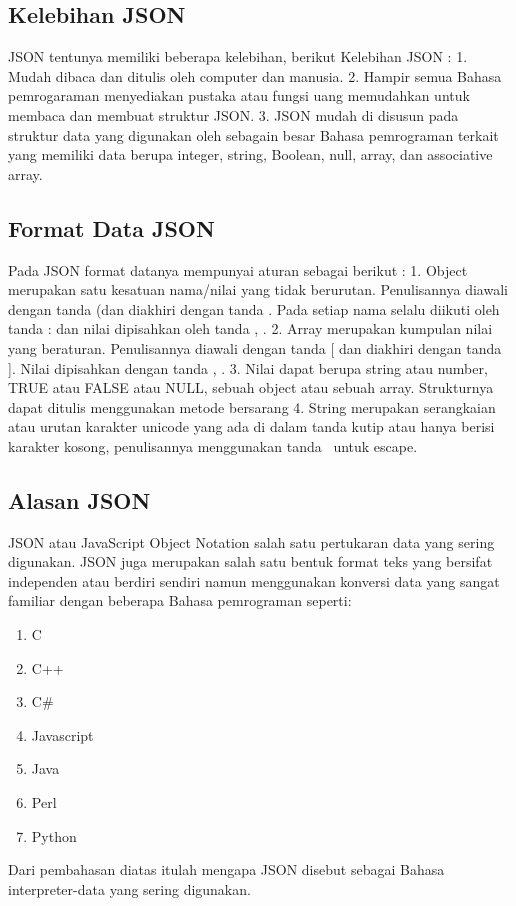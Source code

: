 \documentclass[a4paper]{article}
\begin{document}
\subsection{Kelebihan JSON}
JSON tentunya memiliki beberapa kelebihan, berikut Kelebihan JSON :
1.	Mudah dibaca dan ditulis oleh computer dan manusia.
2.	Hampir semua Bahasa pemrogaraman menyediakan pustaka atau fungsi uang memudahkan untuk membaca dan membuat struktur JSON.
3.	JSON mudah di disusun pada struktur data yang digunakan oleh sebagain besar Bahasa pemrograman terkait yang memiliki data berupa integer, string, Boolean, null, array, dan associative array.

\subsection{Format Data JSON}
Pada JSON format datanya mempunyai aturan sebagai berikut :
1. Object merupakan satu kesatuan nama/nilai yang tidak berurutan. Penulisannya diawali dengan tanda { (dan diakhiri dengan tanda } .
Pada setiap nama selalu diikuti oleh tanda : dan nilai dipisahkan oleh tanda , .
2.  Array merupakan kumpulan nilai yang beraturan. Penulisannya diawali dengan tanda [ dan diakhiri dengan tanda ]. Nilai dipisahkan dengan tanda , .
3. Nilai dapat berupa string atau number, TRUE atau FALSE atau NULL, sebuah object atau sebuah array. Strukturnya dapat ditulis menggunakan metode bersarang
4. String merupakan serangkaian atau urutan karakter unicode yang ada di dalam tanda kutip atau hanya berisi karakter kosong, penulisannya menggunakan tanda \  untuk escape.

\subsection{Alasan JSON}
JSON atau JavaScript Object Notation salah satu pertukaran data yang sering digunakan. JSON juga merupakan salah satu bentuk format teks yang bersifat independen atau berdiri sendiri namun menggunakan konversi data yang sangat familiar dengan beberapa Bahasa pemrograman seperti:

\begin{enumerate}
\item C
\item C++
\item C\#
\item Javascript
\item Java
\item Perl
\item Python

\end{enumerate}
Dari pembahasan diatas itulah mengapa JSON disebut sebagai Bahasa interpreter-data yang sering digunakan.
\end{document}

